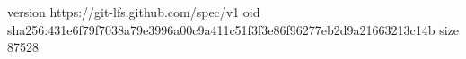 version https://git-lfs.github.com/spec/v1
oid sha256:431e6f79f7038a79e3996a00c9a411c51f3f3e86f96277eb2d9a21663213c14b
size 87528
